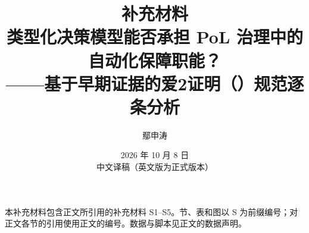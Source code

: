 \documentclass[11pt,UTF8,fontset=windows,zihao=5]{ctexart}
\title{\textbf{补充材料}\\[4pt]\large 类型化决策模型能否承担 PoL 治理中的自动化保障职能？\\——基于早期证据的爱2证明（\pol{}）规范逐条分析}
\author{鄢申涛}
\date{2026 年 10 月 8 日\\[2pt]{\small 中文译稿（英文版为正式版本）}}
\begin{document}
\maketitle
\noindent 本补充材料包含正文所引用的补充材料 S1--S5。节、表和图以 S 为前缀编号；对正文各节的引用使用正文的编号。数据与脚本见正文的数据声明。








\end{document}
